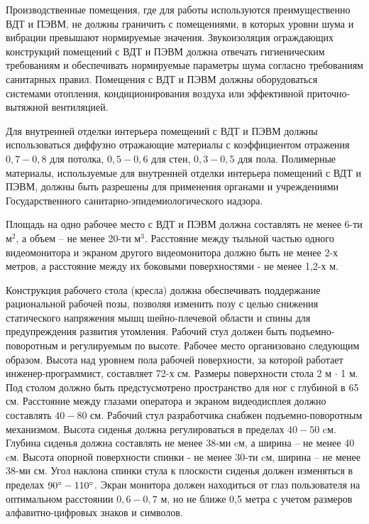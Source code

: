 Производственные помещения, где для работы используются преимущественно ВДТ и
ПЭВМ, не должны граничить с помещениями, в которых уровни шума и вибрации превышают
нормируемые значения. Звукоизоляция ограждающих конструкций помещений с ВДТ и ПЭВМ
должна отвечать гигиеническим требованиям и обеспечивать нормируемые параметры шума
согласно требованиям санитарных правил. Помещения с ВДТ и ПЭВМ должны оборудоваться
системами отопления, кондиционирования воздуха или эффективной приточно-вытяжной
вентиляцией.

Для внутренней отделки интерьера помещений с ВДТ и ПЭВМ должны использоваться
диффузно отражающие материалы с коэффициентом отражения $0,7 - 0,8$ для потолка,
$0,5 - 0,6$ для стен, $0,3 - 0,5$ для пола. Полимерные материалы, используемые для
внутренней отделки интерьера помещений с ВДТ и ПЭВМ, должны быть разрешены для
применения органами и учреждениями Государственного санитарно-эпидемиологического
надзора.

Площадь на одно рабочее место с ВДТ и ПЭВМ должна составлять не менее 6-ти $\text{м}^2$,
а объем – не менее 20-ти $\text{м}^3$. Расстояние между тыльной частью одного
видеомонитора и экраном другого видеомонитора должно быть не менее 2-х метров, а
расстояние между их боковыми поверхностями - не менее 1,2-х м.

Конструкция рабочего стола (кресла) должна обеспечивать поддержание рациональной
рабочей позы, позволяя изменить позу с целью снижения статического напряжения мышц
шейно-плечевой области и спины для предупреждения развития утомления. Рабочий стул
должен быть подъемно-поворотным и регулируемым по высоте. Рабочее место организовано
следующим образом. Высота над уровнем пола рабочей поверхности, за которой работает
инженер-программист, составляет 72-х см. Размеры поверхности стола
2 м $\cdot$ 1 м. Под столом должно быть предстусмотрено пространство
для ног с глубиной в 65 см. Расстояние между глазами оператора и
экраном видеодисплея должно
составлять $40 - 80$ см. Рабочий стул разработчика снабжен подъемно-поворотным
механизмом. Высота сиденья должна регулироваться в пределах $40 - 50$ cм. Глубина
сиденья должна составлять не менее 38-ми cм, а ширина – не менее 40 cм. Высота
опорной поверхности спинки - не менее 30-ти cм, ширина – не менее 38-ми см. Угол наклона
спинки стула к плоскости сиденья должен изменяться в пределах $90 \degree - 110 \degree$.
Экран монитора должен находиться от глаз пользователя на оптимальном
расстоянии $0,6 - 0,7$ м, но не ближе 0,5 метра с учетом размеров алфавитно-цифровых
знаков и символов.

